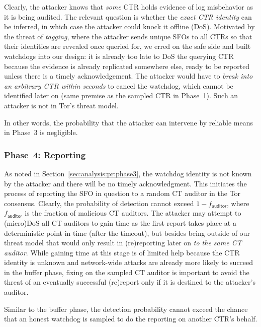 Clearly, the attacker knows that \emph{some} CTR holds evidence of log
misbehavior as it is being audited.  The relevant question is whether the
\emph{exact CTR identity} can be inferred, in which case the attacker could
knock it offline (DoS).  Motivated by the threat of \emph{tagging}, where the
attacker sends unique SFOs to all CTRs so that their identities are revealed
once queried for, we erred on the safe side and built watchdogs into our design:
	it is already too late to DoS the querying CTR because the evidence is
	already replicated somewhere else, ready to be reported unless there is a
	timely acknowledgement.
The attacker would have to \emph{break into an arbitrary CTR within seconds} to
cancel the watchdog, which cannot be identified later on (same premise as
the sampled CTR in Phase~1).  Such an attacker is not in Tor's threat model.

In other words, the probability that the attacker can intervene by reliable
means in Phase~3 is negligible.

\subsubsection{Phase~4: Reporting} \label{sec:analysis:pr:phase4}
As noted in Section~\ref{sec:analysis:pr:phase3}, the watchdog identity is not
known by the attacker and there will be no timely acknowledgment.  This
initiates the process of reporting the SFO in question to a random CT auditor in
the Tor consensus.  Clearly, the probability of detection cannot exceed
$1-f_{\mathsf{auditor}}$, where $f_{\mathsf{auditor}}$ is the fraction of
malicious CT auditors.  The attacker may attempt to (micro)DoS all CT auditors
to gain time as the first report takes place at a deterministic point in time
(after the timeout), but besides being outside of our threat model that would
only result in (re)reporting later on \emph{to the same CT auditor}.
While gaining time at this stage is of limited help because the CTR identity is
unknown and network-wide attacks are already more likely to succeed in the
buffer phase, fixing on the sampled CT auditor is important to avoid the threat
of an eventually successful (re)report only if it is destined to the attacker's
auditor.

Similar to the buffer phase, the detection probability cannot exceed the chance
that an honest watchdog is sampled to do the reporting on another CTR's behalf.
